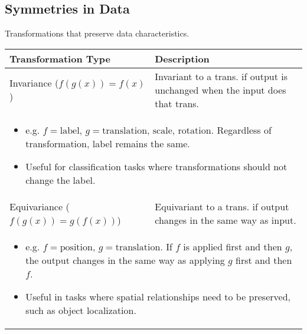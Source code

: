 \subsection{Symmetries in Data}
\begin{summary}
    Transformations that preserve data characteristics. 
    \begin{center}
        \begin{tabular}{ll}
            \toprule
            \textbf{Transformation Type} & \textbf{Description} \\
            \toprule
            Invariance ($f(g(x))=f(x)$) & Invariant to a trans. if output is unchanged when the input does that trans.\\
            \multicolumn{2}{p{\linewidth}}{
            \begin{itemize}
                \item e.g. $f=\text{label}$, $g=\text{translation, scale, rotation}$. Regardless of transformation, label remains the same.
                \item Useful for classification tasks where transformations should not change the label.
            \end{itemize}} \\
            \midrule
            Equivariance ($f(g(x)) = g(f(x))$) & Equivariant to a trans. if output changes in the same way as input. \\
            \multicolumn{2}{p{\linewidth}}{
            \begin{itemize}
                \item e.g. $f=\text{position}$, $g=\text{translation}$. If $f$ is applied first and then $g$, the output changes in the same way as applying $g$ first and then $f$.
                \item Useful in tasks where spatial relationships need to be preserved, such as object localization.
            \end{itemize}} \\
            \bottomrule
        \end{tabular}
    \end{center}
    \vspace{1em}


\end{summary}
